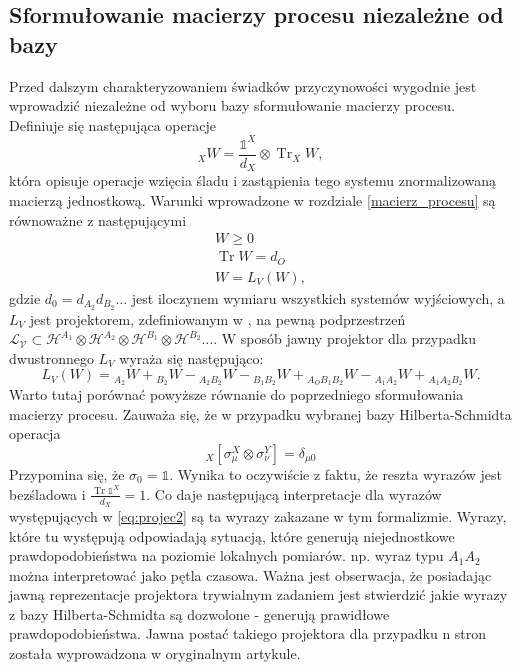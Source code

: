 \documentclass[10pt]{article} %
\DeclareMathOperator{\Trs}{Tr}
\newcommand{\Hx}[1]{\mathcal{H}^{#1}}
\newcommand{\I}{\mathbb{1}}
\begin{document}
\subsection{Sformułowanie macierzy procesu niezależne od bazy}
Przed dalszym charakteryzowaniem świadków przyczynowości wygodnie jest wprowadzić niezależne od wyboru bazy sformułowanie macierzy procesu.
Definiuje się następująca operacje
\begin{equation}
{}_X W = \frac{\I^X}{d_X} \otimes \Trs_X W,
\end{equation}
która opisuje operacje wzięcia śladu i zastąpienia tego systemu znormalizowaną macierzą jednostkową.
Warunki wprowadzone w rozdziale \ref{macierz_procesu} są równoważne z następującymi
\begin{gather}
W \geq 0 \\
\Trs W = d_O \\
W = L_V\left(W\right),
\end{gather}
gdzie $d_0 = d_{A_2} d_{B_2} \dots$ jest iloczynem wymiaru wszystkich systemów wyjściowych, a $L_V$ jest projektorem, zdefiniowanym w \cite{causal_witness}, na pewną podprzestrzeń 
$\mathcal{L_V} \subset \Hx{A_1} \otimes \Hx{A_2} \otimes \Hx{B_1} \otimes \Hx{B_2} \dots$.
W sposób jawny projektor dla przypadku dwustronnego $L_V$ wyraża się następująco:
\begin{equation}
\label{eq:projec2}
L_V(W) = {}_{A_2}W + {}_{B_2}W - {}_{A_2B_2}W - {}_{B_1B_2}W + {}_{A_OB_1B_2}W - {}_{A_1A_2}W + {}_{A_1A_2B_2}W.
\end{equation}
Warto tutaj porównać powyższe równanie do poprzedniego sformułowania macierzy procesu. Zauważa się, że w przypadku wybranej bazy Hilberta-Schmidta
operacja
\begin{equation}
{}_X\left[\sigma_\mu^X \otimes \sigma_\nu^Y\right] = \delta_{\mu0}
\end{equation}
Przypomina się, że $\sigma_0 = \I$.
Wynika to oczywiście z faktu, że reszta wyrazów jest bezśladowa i $\frac{\Trs \I^X}{d_X} = 1$. Co daje następującą interpretacje dla wyrazów występujących w \eqref{eq:projec2} są ta wyrazy zakazane w tym formalizmie. Wyrazy, które tu występują odpowiadają sytuacją, które generują niejednostkowe prawdopodobieństwa na poziomie lokalnych pomiarów. np. wyraz typu $A_1A_2$ można interpretować jako pętla czasowa. Ważna jest obserwacja, że posiadając jawną reprezentacje projektora trywialnym zadaniem jest stwierdzić jakie wyrazy z bazy Hilberta-Schmidta są dozwolone - generują prawidłowe prawdopodobieństwa. Jawna postać takiego projektora dla przypadku n stron została wyprowadzona w oryginalnym artykule.
\end{document}
